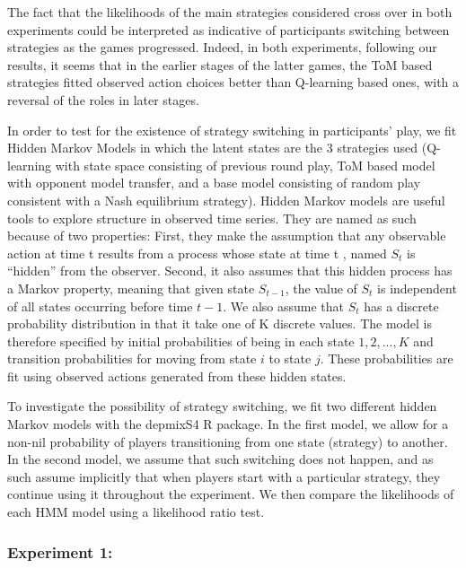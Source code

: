 \documentclass[man,floatsintext]{apa6}
\begin{document}
The fact that the likelihoods of the main strategies considered cross over in both experiments could be interpreted as indicative of participants switching between strategies as the games progressed. Indeed, in both experiments, following our results, it seems that in the earlier stages of the latter games, the ToM based strategies fitted observed action choices better than Q-learning based ones, with a reversal of the roles in later stages.

In order to test for the existence of strategy switching in participants' play, we fit Hidden Markov Models in which the latent states are the 3 strategies used (Q-learning with state space consisting of previous round play, ToM based model with opponent model transfer, and a base model consisting of random play consistent with a Nash equilibrium strategy). Hidden Markov models are useful tools to explore structure in observed time series. They are named as such because of two properties: First, they make the assumption that any observable action at time t results from a process whose state at time t , named \(S_{t}\) is \enquote{hidden} from the observer. Second, it also assumes that this hidden process has a Markov property, meaning that given state \(S_{t-1}\), the value of \(S_{t}\) is independent of all states occurring before time \(t-1\). We also assume that \(S_{t}\) has a discrete probability distribution in that it take one of K discrete values. The model is therefore specified by initial probabilities of being in each state \({1,2,...,K}\) and transition probabilities for moving from state \(i\) to state \(j\). These probabilities are fit using observed actions generated from these hidden states.

To investigate the possibility of strategy switching, we fit two different hidden Markov models with the depmixS4 R package. In the first model, we allow for a non-nil probability of players transitioning from one state (strategy) to another. In the second model, we assume that such switching does not happen, and as such assume implicitly that when players start with a particular strategy, they continue using it throughout the experiment. We then compare the likelihoods of each HMM model using a likelihood ratio test.

\hypertarget{experiment-1-1}{%
\subsubsection{Experiment 1:}\label{experiment-1-1}}
\end{document}
